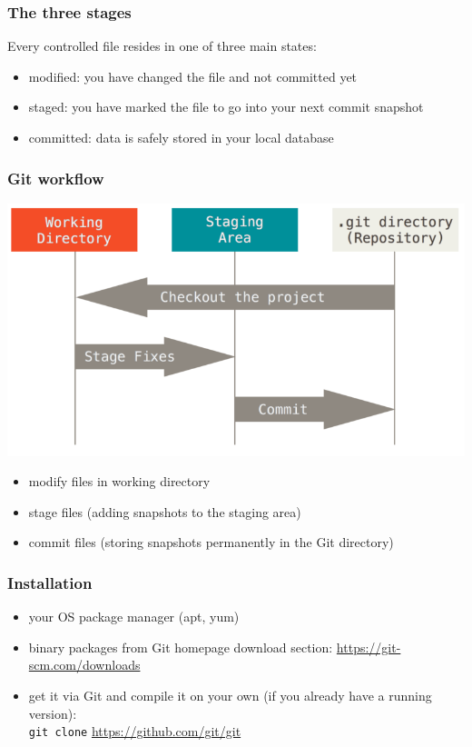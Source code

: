 \documentclass{beamer}
\begin{document}
\begin{frame}
  \frametitle{The three stages}
  Every controlled file resides in one of three main states:
  \begin{itemize}
    \item modified: you have changed the file and not committed yet
    \item staged: you have marked the file to go into your next commit snapshot
    \item committed: data is safely stored in your local database
  \end{itemize}
\end{frame}

\begin{frame}
  \frametitle{Git workflow}
  \centering
  \includegraphics[width=.9\textwidth]{areas}
  \begin{itemize}
    \item modify files in working directory
    \item stage files (adding snapshots to the staging area)
    \item commit files (storing snapshots permanently in the Git directory)
  \end{itemize}
\end{frame}

\begin{frame}[fragile]
  \frametitle{Installation}
  \begin{itemize}
    \item your OS package manager (apt, yum)
    \item binary packages from Git homepage download section: \url{https://git-scm.com/downloads}
    \item get it via Git and compile it on your own (if you already have a running version):\\ 
      \verb+git clone+ \url{https://github.com/git/git}
  \end{itemize}
\end{frame}
\end{document}
